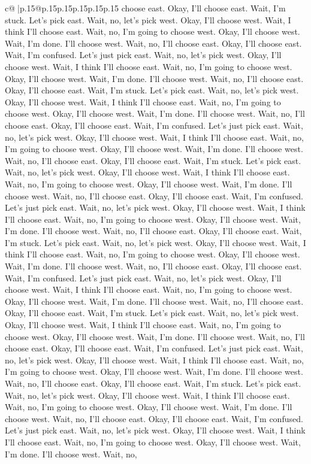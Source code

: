\documentclass{article}
\begin{document}
{\begin{supertabular}{c@{$\;$}|p{.15\linewidth}@{}p{.15\linewidth}p{.15\linewidth}p{.15\linewidth}p{.15\linewidth}p{.15\linewidth}}
{{{choose east. Okay, I'll choose east. Wait, I'm stuck. Let's pick east. Wait, no, let's pick west. Okay, I'll choose west. Wait, I think I'll choose east. Wait, no, I'm going to choose west. Okay, I'll choose west. Wait, I'm done. I'll choose west. Wait, no, I'll choose east. Okay, I'll choose east. Wait, I'm confused. Let's just pick east. Wait, no, let's pick west. Okay, I'll choose west. Wait, I think I'll choose east. Wait, no, I'm going to choose west. Okay, I'll choose west. Wait, I'm done. I'll choose west. Wait, no, I'll choose east. Okay, I'll choose east. Wait, I'm stuck. Let's pick east. Wait, no, let's pick west. Okay, I'll choose west. Wait, I think I'll choose east. Wait, no, I'm going to choose west. Okay, I'll choose west. Wait, I'm done. I'll choose west. Wait, no, I'll choose east. Okay, I'll choose east. Wait, I'm confused. Let's just pick east. Wait, no, let's pick west. Okay, I'll choose west. Wait, I think I'll choose east. Wait, no, I'm going to choose west. Okay, I'll choose west. Wait, I'm done. I'll choose west. Wait, no, I'll choose east. Okay, I'll choose east. Wait, I'm stuck. Let's pick east. Wait, no, let's pick west. Okay, I'll choose west. Wait, I think I'll choose east. Wait, no, I'm going to choose west. Okay, I'll choose west. Wait, I'm done. I'll choose west. Wait, no, I'll choose east. Okay, I'll choose east. Wait, I'm confused. Let's just pick east. Wait, no, let's pick west. Okay, I'll choose west. Wait, I think I'll choose east. Wait, no, I'm going to choose west. Okay, I'll choose west. Wait, I'm done. I'll choose west. Wait, no, I'll choose east. Okay, I'll choose east. Wait, I'm stuck. Let's pick east. Wait, no, let's pick west. Okay, I'll choose west. Wait, I think I'll choose east. Wait, no, I'm going to choose west. Okay, I'll choose west. Wait, I'm done. I'll choose west. Wait, no, I'll choose east. Okay, I'll choose east. Wait, I'm confused. Let's just pick east. Wait, no, let's pick west. Okay, I'll choose west. Wait, I think I'll choose east. Wait, no, I'm going to choose west. Okay, I'll choose west. Wait, I'm done. I'll choose west. Wait, no, I'll choose east. Okay, I'll choose east. Wait, I'm stuck. Let's pick east. Wait, no, let's pick west. Okay, I'll choose west. Wait, I think I'll choose east. Wait, no, I'm going to choose west. Okay, I'll choose west. Wait, I'm done. I'll choose west. Wait, no, I'll choose east. Okay, I'll choose east. Wait, I'm confused. Let's just pick east. Wait, no, let's pick west. Okay, I'll choose west. Wait, I think I'll choose east. Wait, no, I'm going to choose west. Okay, I'll choose west. Wait, I'm done. I'll choose west. Wait, no, I'll choose east. Okay, I'll choose east. Wait, I'm stuck. Let's pick east. Wait, no, let's pick west. Okay, I'll choose west. Wait, I think I'll choose east. Wait, no, I'm going to choose west. Okay, I'll choose west. Wait, I'm done. I'll choose west. Wait, no, I'll choose east. Okay, I'll choose east. Wait, I'm confused. Let's just pick east. Wait, no, let's pick west. Okay, I'll choose west. Wait, I think I'll choose east. Wait, no, I'm going to choose west. Okay, I'll choose west. Wait, I'm done. I'll choose west. Wait, no, }}}
\end{supertabular}}
\end{document}
